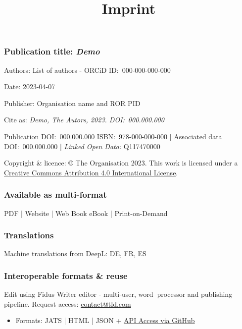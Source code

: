 \documentclass{article}
\begin{document}
\title{Imprint}

\maketitle


\subsubsection{Publication title: \emph{Demo }}\label{H6864698}



Authors: List of authors - ORCiD ID: 000-000-000-000


Date: 2023-04-07


Publisher: Organisation name and ROR PID


Cite as: \emph{Demo, The Autors, 2023. DOI:} \emph{000.000.000}


Publication DOI: 000.000.000 ISBN: 978-000-000-000 | Associated data DOI: 000.000.000 | \emph{Linked Open Data: }Q117470000


Copyright \& licence: © The Organisation 2023. This work is licensed under a \href{https://creativecommons.org/licenses/by/4.0/}{Creative Commons Attribution 4.0 International License}.


\subsubsection{Available as multi-format}\label{H8085668}



PDF | Website | Web Book eBook | Print-on-Demand 


\subsubsection{Translations}\label{H5866075}



Machine translations from DeepL: DE, FR, ES 


\subsubsection{Interoperable formats \& reuse}\label{H4022411}



Edit using Fidus Writer editor - multi‑user, word\textbf{ }processor and publishing pipeline. Request access: \href{contact@tld.com}{contact@tld.com}

\begin{itemize}
\item Formats: JATS | HTML | JSON + \href{https://docs.github.com/en/rest/guides/getting-started-with-the-rest-api?apiVersion=2022-11-28}{API Access via GitHub}


\end{itemize}
\end{document}
